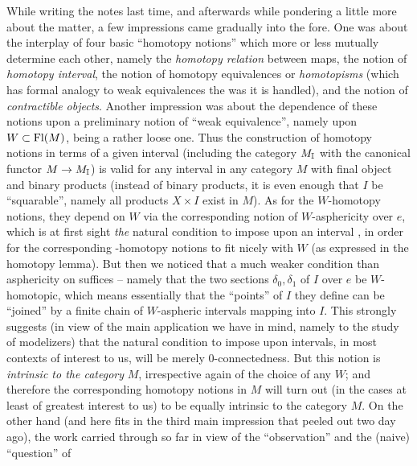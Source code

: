 \label{sec:50}%
While writing the notes last time, and afterwards while pondering a
little more about the matter, a few impressions came gradually into
the fore. One was about the interplay of four basic ``homotopy
notions'' which more or less mutually determine each other, namely the
\emph{homotopy relation} between maps, the notion of \emph{homotopy
  interval}, the notion of homotopy equivalences or \emph{homotopisms}
(which has formal analogy to weak equivalences the was it
is handled), and the notion of \emph{contractible objects}. Another
impression was about the dependence of these notions upon a
preliminary notion of ``weak equivalence'', namely upon
$W \subset \operatorname{Fl}(M)$, being a rather loose one. Thus the construction of
homotopy notions in terms of a given interval \bI{} (including the
category $M_{\mathbb{I}}$ with the canonical functor $M\to M_{\mathbb{I}}$) is valid for
any interval in any category $M$ with final object and binary products
(instead of binary products, it is even enough that $I$ be
``squarable'', namely all products $X\times I$ exist in $M$). As for
the $W$-homotopy notions, they depend on $W$ via the corresponding
notion of $W$-asphericity over $e$, which is at first sight \emph{the}
natural condition to impose upon an interval \bI, in order for the
corresponding \bI-homotopy notions to fit nicely with $W$ (as
expressed in the homotopy lemma). But then we noticed that a much
weaker condition than asphericity on \bI{} suffices -- namely that the
two sections $\delta_0,\delta_1$ of $I$ over $e$ be $W$-homotopic,
which means essentially that the ``points'' of $I$ they define can be
``joined'' by a finite chain of $W$-aspheric intervals mapping into
$I$. This strongly suggests (in view of the main application we have
in mind, namely to the study of modelizers) that the natural condition
to impose upon intervals, in most contexts of interest to us, will be
merely $0$-connectedness. But this notion is \emph{intrinsic to the
  category} $M$, irrespective again of the choice of any $W$; and
therefore the corresponding homotopy notions in $M$ will turn out (in
the cases at least of greatest interest to us) to be equally intrinsic
to the category $M$. On the other hand (and here fits in the third
main impression that peeled out two day ago), the work carried through
so far in view of the ``observation'' and the (naive) ``question'' of
